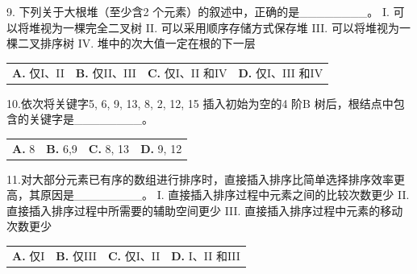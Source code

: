 \documentclass[UTF8,11pt]{ctexart}
\begin{document}
9. 下列关于大根堆（至少含2 个元素）的叙述中，正确的是\_\_\_\_\_\_\_\_。 I. 可以将堆视为一棵完全二叉树 II. 可以采用顺序存储方式保存堆 III. 可以将堆视为一棵二叉排序树 IV. 堆中的次大值一定在根的下一层


\begin{center}\begin{tabular}{>{\raggedright\arraybackslash}p{\dimexpr(\linewidth-8\tabcolsep)/4\relax}>{\raggedright\arraybackslash}p{\dimexpr(\linewidth-8\tabcolsep)/4\relax}>{\raggedright\arraybackslash}p{\dimexpr(\linewidth-8\tabcolsep)/4\relax}>{\raggedright\arraybackslash}p{\dimexpr(\linewidth-8\tabcolsep)/4\relax}}
\textbf{A.} 仅I、II & \textbf{B.} 仅II、III & \textbf{C.} 仅I、II 和IV & \textbf{D.} 仅I、III 和IV\\[.35em]\end{tabular}\end{center}

10.依次将关键字5, 6, 9, 13, 8, 2, 12, 15 插入初始为空的4 阶B 树后，根结点中包含的关键字是\_\_\_\_\_\_\_\_。


\begin{center}\begin{tabular}{>{\raggedright\arraybackslash}p{\dimexpr(\linewidth-8\tabcolsep)/4\relax}>{\raggedright\arraybackslash}p{\dimexpr(\linewidth-8\tabcolsep)/4\relax}>{\raggedright\arraybackslash}p{\dimexpr(\linewidth-8\tabcolsep)/4\relax}>{\raggedright\arraybackslash}p{\dimexpr(\linewidth-8\tabcolsep)/4\relax}}
\textbf{A.} 8 & \textbf{B.} 6,9 & \textbf{C.} 8, 13 & \textbf{D.} 9, 12\\[.35em]\end{tabular}\end{center}

11.对大部分元素已有序的数组进行排序时，直接插入排序比简单选择排序效率更高，其原因是\_\_\_\_\_\_\_\_。 I. 直接插入排序过程中元素之间的比较次数更少 II. 直接插入排序过程中所需要的辅助空间更少 III. 直接插入排序过程中元素的移动次数更少


\begin{center}\begin{tabular}{>{\raggedright\arraybackslash}p{\dimexpr(\linewidth-8\tabcolsep)/4\relax}>{\raggedright\arraybackslash}p{\dimexpr(\linewidth-8\tabcolsep)/4\relax}>{\raggedright\arraybackslash}p{\dimexpr(\linewidth-8\tabcolsep)/4\relax}>{\raggedright\arraybackslash}p{\dimexpr(\linewidth-8\tabcolsep)/4\relax}}
\textbf{A.} 仅I & \textbf{B.} 仅III & \textbf{C.} 仅I、II & \textbf{D.} I、II 和III\\[.35em]\end{tabular}\end{center}
\end{document}
